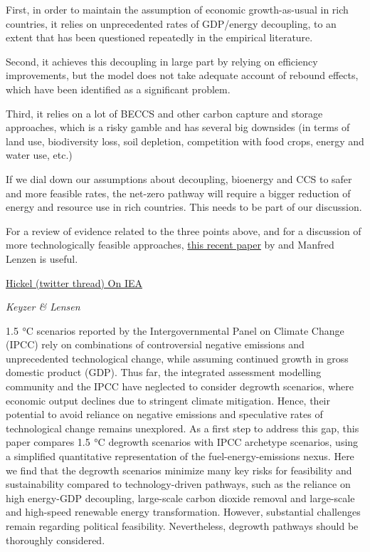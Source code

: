 \documentclass[
]{book}
\begin{document}
First, in order to maintain the assumption of economic growth-as-usual in rich countries, it relies on unprecedented rates of GDP/energy decoupling, to an extent that has been questioned repeatedly in the empirical literature.

Second, it achieves this decoupling in large part by relying on efficiency improvements, but the model does not take adequate account of rebound effects, which have been identified as a significant problem.

Third, it relies on a lot of BECCS and other carbon capture and storage approaches, which is a risky gamble and has several big downsides (in terms of land use, biodiversity loss, soil depletion, competition with food crops, energy and water use, etc.)

If we dial down our assumptions about decoupling, bioenergy and CCS to safer and more feasible rates, the net-zero pathway will require a bigger reduction of energy and resource use in rich countries. This needs to be part of our discussion.

For a review of evidence related to the three points above, and for a discussion of more technologically feasible approaches, \href{https://www.nature.com/articles/s41467-021-22884-9}{this recent paper} by \citet{LorenzClimate} and Manfred Lenzen is useful.

\href{https://twitter.com/jasonhickel/status/1394940762891169794}{Hickel (twitter thread) On IEA}

\emph{Keyzer \& Lensen }

1.5  °C scenarios reported by the Intergovernmental Panel on Climate Change (IPCC) rely on combinations of controversial negative emissions and unprecedented technological change, while assuming continued growth in gross domestic product (GDP). Thus far, the integrated assessment modelling community and the IPCC have neglected to consider degrowth scenarios, where economic output declines due to stringent climate mitigation. Hence, their potential to avoid reliance on negative emissions and speculative rates of technological change remains unexplored. As a first step to address this gap, this paper compares 1.5  °C degrowth scenarios with IPCC archetype scenarios, using a simplified quantitative representation of the fuel-energy-emissions nexus. Here we find that the degrowth scenarios minimize many key risks for feasibility and sustainability compared to technology-driven pathways, such as the reliance on high energy-GDP decoupling, large-scale carbon dioxide removal and large-scale and high-speed renewable energy transformation. However, substantial challenges remain regarding political feasibility. Nevertheless, degrowth pathways should be thoroughly considered.
\end{document}
